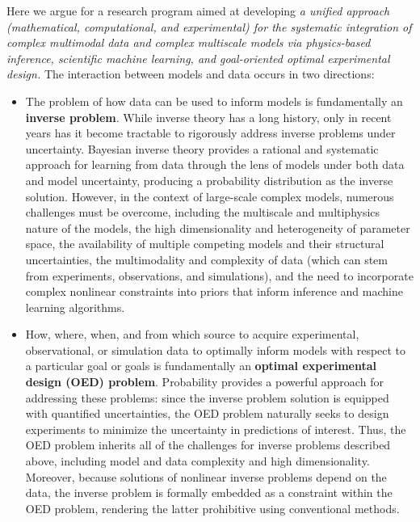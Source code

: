 \documentclass[11pt]{article}
\newcommand{\zapspace}{\topsep=0pt\partopsep=0pt\itemsep=0pt\parskip=0pt}
\begin{document}
Here we argue for a research program aimed at developing {\em a
  unified approach (mathematical, computational, and experimental) for
  the systematic integration of complex multimodal data and complex
  multiscale models via physics-based inference, scientific machine learning,
  and goal-oriented optimal experimental design.}  The interaction
between models and data occurs in two directions:
 \vspace{-0.15cm}
 \begin{itemize}%
 \zapspace
 \item The problem of how data can be used to inform models is
   fundamentally an {\bf inverse problem}. While inverse theory has a
   long history, only in recent years has it become tractable to
   rigorously address inverse problems under uncertainty. Bayesian
   inverse theory provides a rational and systematic approach for
   learning from data through the lens of models under both data and
   model uncertainty, producing a probability distribution as the
   inverse solution.  However, in the context of large-scale complex
   models, numerous challenges must be overcome, including the
   multiscale and multiphysics nature of the models, the high
   dimensionality and heterogeneity of parameter space, the
   availability of multiple competing models and their structural
   uncertainties, the multimodality and complexity of data (which can
   stem from experiments, observations, and simulations), and the need
   to incorporate complex nonlinear constraints into priors that
   inform inference and machine learning algorithms.

\item How, where, when, and from which source to acquire experimental,
  observational, or simulation data to optimally inform models
  with respect to a particular goal or goals is fundamentally an {\bf
    optimal experimental design (OED) problem}. Probability provides a
  powerful approach for addressing these problems: since the inverse
  problem solution is equipped with quantified uncertainties, the OED
  problem naturally seeks to design experiments to minimize the
  uncertainty in predictions of interest.  Thus, the OED problem
  inherits all of the challenges for inverse problems described above,
  including model and data complexity and high
  dimensionality. Moreover, because solutions of nonlinear inverse
  problems depend on the data, the inverse problem is formally
  embedded as a constraint within the OED problem, rendering the
  latter prohibitive using conventional methods.

\end{itemize}
\end{document}
